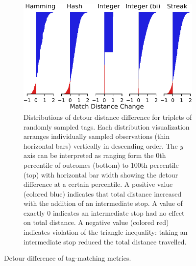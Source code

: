 \begin{figure}
\begin{center}
\begin{minipage}{\linewidth}
\begin{subfigure}[b]{\linewidth}
\includegraphics[width=\linewidth]{img/detour_difference/bitweight=0dot5+seed=1+title=low-triplet-analysis+_data_hathash_hash=6b0749ef97a58721+_script_fullcat_hash=297c4fe09078e17b+ext=}
\caption{
Distributions of detour distance difference for triplets of randomly sampled tags.
Each distribution visualization arranges individually sampled observations (thin horizontal bars) vertically in descending order.
The $y$ axis can be interpreted as ranging form the 0th percentile of outcomes (bottom) to 100th percentile (top) with horizontal bar width showing the detour difference at a certain percentile.
A positive value (colored blue) indicates that total distance increased with the addition of an intermediate stop.
A value of exactly 0 indicates an intermediate stop had no effect on total distance.
A negative value (colored red) indicates violation of the triangle inequality: taking an intermediate stop reduced the total distance travelled.
} \label{fig:detour_difference_distribution}

\end{subfigure}
\end{minipage}

\caption{
Detour difference of tag-matching metrics.
}
\label{fig:detour_difference}

\end{center}
\end{figure}
